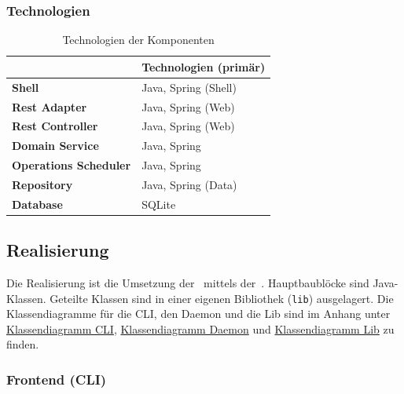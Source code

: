 \documentclass[a4paper,12pt]{report}
\begin{document}
    \subsubsection{Technologien}
    \begin{table}[h!]
        \centering
        \setlength{\leftmargini}{0.4cm}
        \begin{tabular}{|p{5.5cm}|p{5cm}|}
            \hline
            & \textbf{Technologien (primär)} \\
            \hline
            \textbf{Shell}                & Java, Spring (Shell)           \\
            \hline
            \textbf{Rest Adapter}         & Java, Spring (Web)             \\
            \hline
            \textbf{Rest Controller}      & Java, Spring (Web)             \\
            \hline
            \textbf{Domain Service}       & Java, Spring                   \\
            \hline
            \textbf{Operations Scheduler} & Java, Spring                   \\
            \hline
            \textbf{Repository}           & Java, Spring (Data)            \\
            \hline
            \textbf{Database}             & SQLite                         \\
            \hline
        \end{tabular}
        \caption{Technologien der Komponenten}\label{tab:table}
    \end{table}

    \clearpage

    \subsection{Realisierung}\label{subsec:realisierung}
    Die Realisierung ist die Umsetzung der~ mittels der~.
    Hauptbaublöcke sind Java-Klassen.
    Geteilte Klassen sind in einer eigenen Bibliothek (\texttt{lib}) ausgelagert.
    Die Klassendiagramme für die CLI, den Daemon und die Lib sind im Anhang unter \hyperref[sec:class-diag-cli]{Klassendiagramm CLI}, \hyperref[sec:class-diag-daemon]{Klassendiagramm Daemon} und \hyperref[sec:class-diag-lib]{Klassendiagramm Lib} zu finden.

    \subsubsection{Frontend (CLI)}
\end{document}
